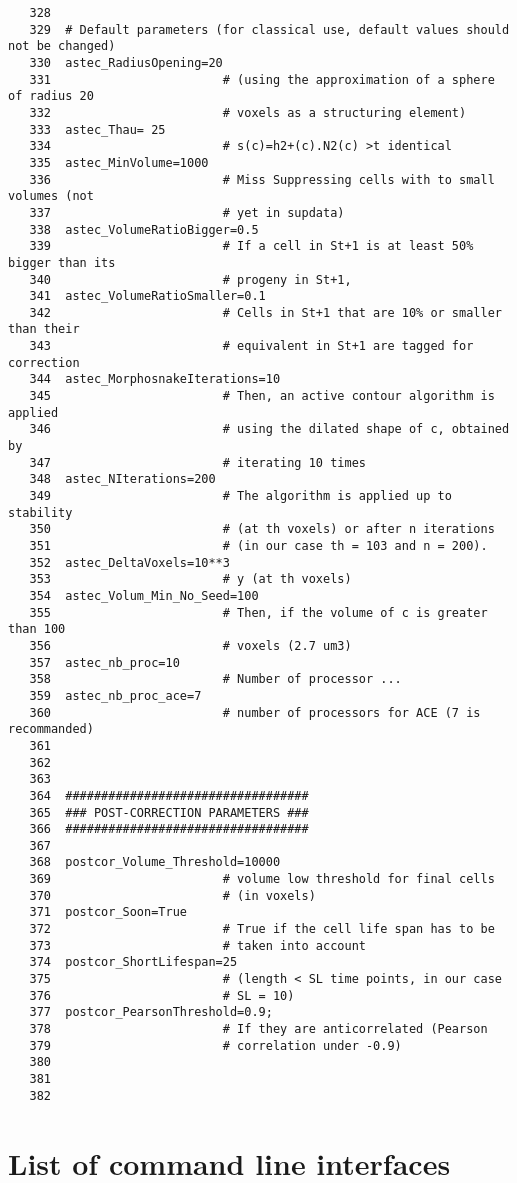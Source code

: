 \begin{verbatim}
   328	
   329	# Default parameters (for classical use, default values should not be changed)
   330	astec_RadiusOpening=20 		
   331	                      # (using the approximation of a sphere of radius 20
   332						  # voxels as a structuring element)
   333	astec_Thau= 25 				
   334	                      # s(c)=h2+(c).N2(c) >t identical
   335	astec_MinVolume=1000 		
   336	                      # Miss Suppressing cells with to small volumes (not
   337						  # yet in supdata)
   338	astec_VolumeRatioBigger=0.5 
   339	                      # If a cell in St+1 is at least 50% bigger than its
   340						  # progeny in St+1, 
   341	astec_VolumeRatioSmaller=0.1
   342	                      # Cells in St+1 that are 10% or smaller than their
   343						  # equivalent in St+1 are tagged for correction
   344	astec_MorphosnakeIterations=10 
   345	                      # Then, an active contour algorithm is applied
   346					      # using the dilated shape of c, obtained by 
   347						  # iterating 10 times
   348	astec_NIterations=200 		
   349	                      # The algorithm is applied up to stability 
   350						  # (at th voxels) or after n iterations 
   351						  # (in our case th = 103 and n = 200). 
   352	astec_DeltaVoxels=10**3  	
   353	                      # y (at th voxels)
   354	astec_Volum_Min_No_Seed=100 
   355	                      # Then, if the volume of c is greater than 100 
   356						  # voxels (2.7 um3)
   357	astec_nb_proc=10 			
   358	                      # Number of processor ...
   359	astec_nb_proc_ace=7   		
   360	                      # number of processors for ACE (7 is recommanded)
   361	
   362	
   363	
   364	##################################
   365	### POST-CORRECTION PARAMETERS ###
   366	##################################
   367	
   368	postcor_Volume_Threshold=10000 	
   369	                      # volume low threshold for final cells 
   370						  # (in voxels) 
   371	postcor_Soon=True 				
   372	                      # True if the cell life span has to be 
   373						  # taken into account
   374	postcor_ShortLifespan=25 		
   375	                      # (length < SL time points, in our case 
   376						  # SL = 10)
   377	postcor_PearsonThreshold=0.9; 	
   378	                      # If they are anticorrelated (Pearson 
   379						  # correlation under -0.9)
   380	
   381	
   382	
\end{verbatim}


\section{List of command line interfaces}

